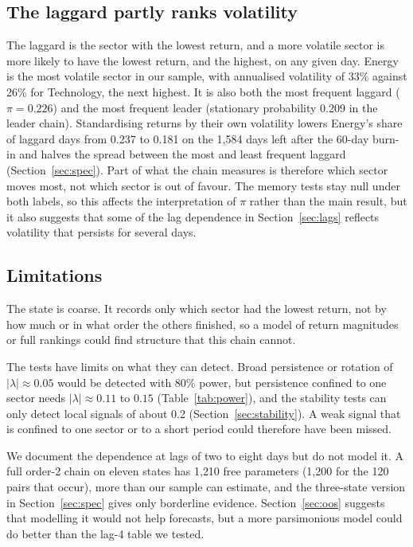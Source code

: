 \documentclass[11pt]{article}
\begin{document}
\subsection{The laggard partly ranks volatility}

The laggard is the sector with the lowest return, and a more volatile sector is more likely to have the lowest return, and the highest, on any given day. Energy is the most volatile sector in our sample, with annualised volatility of 33\% against 26\% for Technology, the next highest. It is also both the most frequent laggard ($\pi = 0.226$) and the most frequent leader (stationary probability 0.209 in the leader chain). Standardising returns by their own volatility lowers Energy's share of laggard days from 0.237 to 0.181 on the 1{,}584 days left after the 60-day burn-in and halves the spread between the most and least frequent laggard (Section~\ref{sec:spec}). Part of what the chain measures is therefore which sector moves most, not which sector is out of favour. The memory tests stay null under both labels, so this affects the interpretation of $\pi$ rather than the main result, but it also suggests that some of the lag dependence in Section~\ref{sec:lags} reflects volatility that persists for several days.

\subsection{Limitations}

The state is coarse. It records only which sector had the lowest return, not by how much or in what order the others finished, so a model of return magnitudes or full rankings could find structure that this chain cannot.

The tests have limits on what they can detect. Broad persistence or rotation of $|\lambda| \approx 0.05$ would be detected with 80\% power, but persistence confined to one sector needs $|\lambda| \approx 0.11$ to $0.15$ (Table~\ref{tab:power}), and the stability tests can only detect local signals of about 0.2 (Section~\ref{sec:stability}). A weak signal that is confined to one sector or to a short period could therefore have been missed.

We document the dependence at lags of two to eight days but do not model it. A full order-2 chain on eleven states has 1{,}210 free parameters (1{,}200 for the 120 pairs that occur), more than our sample can estimate, and the three-state version in Section~\ref{sec:spec} gives only borderline evidence. Section~\ref{sec:oos} suggests that modelling it would not help forecasts, but a more parsimonious model could do better than the lag-4 table we tested.
\end{document}
